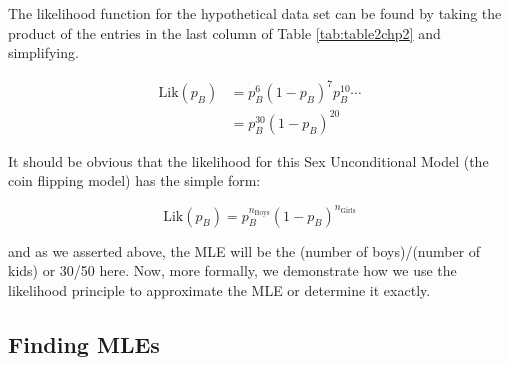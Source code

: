 \documentclass[
]{krantz}
\newcommand{\lik}{\mathrm{Lik}}
\begin{document}
\begin{table}
\centering
\caption{\label{tab:table2chp2}The likelihood factors for the hypothetical data set of n=50 children.}
\centering
{}
\end{table}

The likelihood function for the hypothetical data set can be found by taking the product of the entries in the last column of Table \ref{tab:table2chp2} and simplifying.

\begin{equation}
\begin{split}
 \lik(p_B) &= p_B^{6}(1-p_B)^{7}p_B^{10} \cdots \\
 &= p_B^{30}(1-p_B)^{20}
\end{split}
\label{eq:lik30} 
\end{equation}

It should be obvious that the likelihood for this Sex Unconditional Model (the coin flipping model) has the simple form:

\begin{equation*}
\lik(p_B) = p_B^{n_\textrm{Boys}}(1-p_B)^{n_\textrm{Girls}}
\end{equation*}

and as we asserted above, the MLE will be the (number of boys)/(number of kids) or 30/50 here. Now, more formally, we demonstrate how we use the likelihood principle to approximate the MLE or determine it exactly.

\subsection{Finding MLEs}\label{findMLE.sec}
\end{document}
